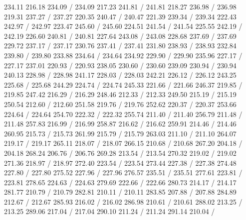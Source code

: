 { 234.11 216.18 234.09 /
 234.09 217.23 241.81 /
 241.81 218.27 236.98 /
 236.98 219.31 237.27 /
 237.27 220.35 240.47 /
 240.47 221.39 239.34 /
 239.34 222.43 242.97 /
 242.97 223.47 245.60 /
 245.60 224.51 241.54 /
 241.54 225.55 242.19 /
 242.19 226.60 240.81 /
 240.81 227.64 243.08 /
 243.08 228.68 237.69 /
 237.69 229.72 237.17 /
 237.17 230.76 237.41 /
 237.41 231.80 238.93 /
 238.93 232.84 239.80 /
 239.80 233.88 234.64 /
 234.64 234.92 229.90 /
 229.90 235.96 227.17 /
 227.17 237.01 220.93 /
 220.93 238.05 230.60 /
 230.60 239.09 230.94 /
 230.94 240.13 228.98 /
 228.98 241.17 228.03 /
 228.03 242.21 226.12 /
 226.12 243.25 225.68 /
 225.68 244.29 224.74 /
 224.74 245.33 221.66 /
 221.66 246.37 219.85 /
 219.85 247.42 216.29 /
 216.29 248.46 212.33 /
 212.33 249.50 215.19 /
 215.19 250.54 212.60 /
 212.60 251.58 219.76 /
 219.76 252.62 220.37 /
 220.37 253.66 224.64 /
 224.64 254.70 222.32 /
 222.32 255.74 211.40 /
 211.40 256.79 211.48 /
 211.48 257.83 216.99 /
 216.99 258.87 216.62 /
 216.62 259.91 214.46 /
 214.46 260.95 215.73 /
 215.73 261.99 215.79 /
 215.79 263.03 211.10 /
 211.10 264.07 219.17 /
 219.17 265.11 218.07 /
 218.07 266.15 210.68 /
 210.68 267.20 204.18 /
 204.18 268.24 206.76 /
 206.76 269.28 213.54 /
 213.54 270.32 219.02 /
 219.02 271.36 218.97 /
 218.97 272.40 223.54 /
 223.54 273.44 227.38 /
 227.38 274.48 227.80 /
 227.80 275.52 227.96 /
 227.96 276.57 235.51 /
 235.51 277.61 223.81 /
 223.81 278.65 224.63 /
 224.63 279.69 222.66 /
 222.66 280.73 214.17 /
 214.17 281.77 210.79 /
 210.79 282.81 210.11 /
 210.11 283.85 207.88 /
 207.88 284.89 212.67 /
 212.67 285.93 216.02 /
 216.02 286.98 210.61 /
 210.61 288.02 213.25 /
 213.25 289.06 217.04 /
 217.04 290.10 211.24 /
 211.24 291.14 210.04 /
}
